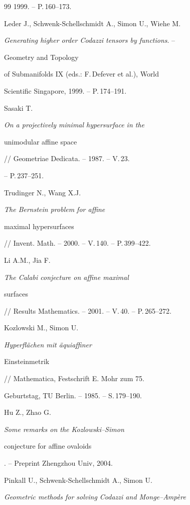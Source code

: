 \begin{thebibliography}{99}
1999. -- P.\,160--173.




Leder J., Schwenk-Schellschmidt A., Simon U., Wiehe M.

{\it Generating higher order Codazzi tensors by functions}. --

Geometry and Topology

of Submanifolds IX (eds.: F.\,Defever et al.), World

Scientific Singapore, 1999. -- P.\,174--191.




Sasaki T. {\it On a projectively minimal hypersurface in the

unimodular affine space} // Geometriae Dedicata. -- 1987. -- V.\,23.

-- P.\,237--251.




Trudinger N., Wang X.J. {\it The Bernstein problem for affine

maximal hypersurfaces} // Invent. Math. -- 2000. -- V.\,140. -- P.\,399--422.




Li A.M., Jia F. {\it The Calabi conjecture on affine maximal

surfaces} // Results Mathematics. -- 2001. -- V.\,40. -- P.\,265--272.




Kozlowski M., Simon U. {\it Hyperfl{\"a}chen mit {\"a}quiaffiner

Einsteinmetrik} // Mathematica, Festschrift E. Mohr zum 75.

Geburtstag, TU Berlin. -- 1985. -- S.\,179--190.




Hu Z., Zhao G. {\it Some remarks on the Kozlowski--Simon

conjecture for affine ovaloids}. -- Preprint Zhengzhou Univ, 2004.




Pinkall U., Schwenk-Schellschmidt A., Simon U.

{\it Geometric methods for solving Codazzi and Monge--Amp\`{e}re

}
\end{thebibliography}
